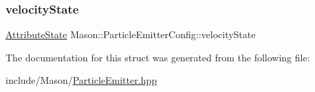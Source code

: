 \subsubsection{\texorpdfstring{velocity\+State}{velocityState}}
{\footnotesize\ttfamily \hyperlink{namespace_mason_aefc2ce7d9295b57af46ab6c8ebfc32f7}{Attribute\+State} Mason\+::\+Particle\+Emitter\+Config\+::velocity\+State}



The documentation for this struct was generated from the following file\+:\begin{DoxyCompactItemize}
\item 
include/\+Mason/\hyperlink{_particle_emitter_8hpp}{Particle\+Emitter.\+hpp}\end{DoxyCompactItemize}
